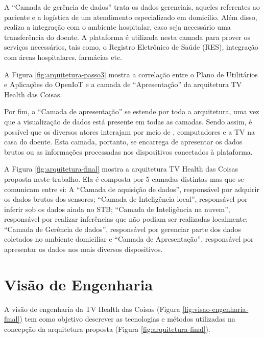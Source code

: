 A ``Camada de gerência de dados'' trata os dados gerenciais, aqueles
referentes ao paciente e a logística de um atendimento especializado em
domicílio. Além disso, realiza a integração com o ambiente hospitalar, caso
seja necessário uma transferência do doente. A plataforma \nextsaude[]
é utilizada nesta camada para prover os serviços necessários, tais como, o 
Registro Eletrônico de Saúde (RES), integração com áreas hospitalares, farmácias etc.

A Figura \ref{fig:arquitetura-passo3} mostra a correlação entre o Plano
de Utilitários e Aplicações do OpenIoT e a camada de ``Apresentação'' da arquitetura 
TV Health das Coisas.


Por fim, a ``Camada de apresentação'' se estende por toda a arquitetura, uma
vez que a visualização de dados está presente em todas as camadas. Sendo assim,
é possível que os diversos atores interajam por meio de \smartphones,
computadores e a TV na casa do doente.  Esta camada, portanto, se encarrega de
apresentar os dados brutos ou as informações processadas nos dispositivos
conectados à plataforma. 

A Figura \ref{fig:arquitetura-final} mostra a arquitetura TV Health das Coisas 
proposta neste trabalho. Ela é composta por 5 camadas distintas mas que se comunicam
entre si: A ``Camada de aquisição de
dados'', responsável por adquirir os dados brutos dos sensores; ``Camada de
Inteligência local'', responsável por inferir sob os dados ainda no
STB; ``Camada de Inteligência na nuvem'', responsável por realizar
inferências que não podiam ser realizadas localmente; ``Camada de Gerência
de dados'', responsável por gerenciar parte dos dados coletados no ambiente
domiciliar e ``Camada de Apresentação'', responsável por
apresentar os dados nos mais diversos dispositivos.


\section{Visão de Engenharia} \label{sec:visao-engenharia}

A visão de engenharia da TV Health das Coisas (Figura
\ref{fig:visao-engenharia-final}) tem como objetivo descrever as tecnologias e
métodos utilizadas na concepção da arquitetura proposta (Figura
\ref{fig:arquitetura-final}).

